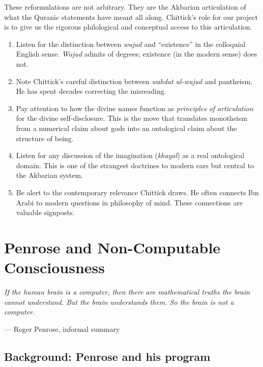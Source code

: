 \documentclass[11pt,a4paper]{book}
\theoremstyle{cleanrm}
\begin{document}
These reformulations are not arbitrary. They are the Akbarian
articulation of what the Quranic statements have meant all along.
Chittick's role for our project is to give us the rigorous
philological and conceptual access to this articulation.

\begin{watchbox}
\begin{enumerate}[leftmargin=2em]
    \item Listen for the distinction between \emph{wujud} and
    ``existence'' in the colloquial English sense. \emph{Wujud}
    admits of degrees; existence (in the modern sense) does not.
    \item Note Chittick's careful distinction between \emph{wahdat
    al-wujud} and pantheism. He has spent decades correcting the
    misreading.
    \item Pay attention to how the divine names function as
    \emph{principles of articulation} for the divine self-disclosure.
    This is the move that translates monotheism from a numerical
    claim about gods into an ontological claim about the structure of
    being.
    \item Listen for any discussion of the imagination (\emph{khayal})
    as a real ontological domain. This is one of the strangest doctrines
    to modern ears but central to the Akbarian system.
    \item Be alert to the contemporary relevance Chittick draws.
    He often connects Ibn Arabi to modern questions in philosophy
    of mind. These connections are valuable signposts.
\end{enumerate}
\end{watchbox}

\chapter{Penrose and Non-Computable Consciousness}

\epigraph{\itshape If the human brain is a computer, then there are
mathematical truths the brain cannot understand. But the brain
understands them. So the brain is not a computer.}{--- Roger Penrose,
informal summary}

\section{Background: Penrose and his program}
\end{document}
